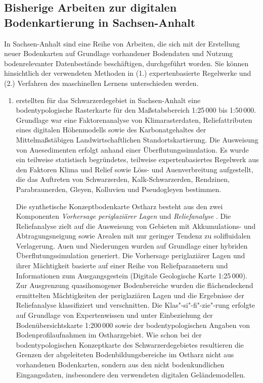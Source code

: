 \subsection{Bisherige Arbeiten zur digitalen Bodenkartierung in Sachsen-Anhalt}\label{sec:dsm}
In Sachsen-Anhalt sind eine Reihe von Arbeiten, die sich mit der Erstellung neuer Bodenkarten auf Grundlage vorhandener Bodendaten und Nutzung bodenrelevanter Datenbestände beschäftigen, durchgeführt worden. Sie können hinsichtlich der verwendeten Methoden in (1.) expertenbasierte Regelwerke und (2.) Verfahren des maschinellen Lernens unterschieden werden.

\begin{enumerate}
\item \citet{BehrensScholten2003a} erstellten für das Schwarzerdegebiet in Sachsen-Anhalt eine bodentypologische Rasterkarte für den Maßstabsbereich 1:25\,000 bis 1:50\,000. Grundlage war eine Faktorenanalyse von Klimarasterdaten, Reliefattributen eines digitalen Höhenmodells sowie des Karbonatgehaltes der Mittelmaßstäbigen Landwirtschaftlichen Standortskartierung. Die Ausweisung von Auesedimenten erfolgt anhand einer Überflutungssimulation. Es wurde ein teilweise statistisch begründetes, teilweise expertenbasiertes Regelwerk aus den Faktoren Klima und Relief sowie Löss- und Auenverbreitung aufgestellt, die das Auftreten von Schwarzerden, Kalk-Schwarzerden, Rendzinen, Parabraunerden, Gleyen, Kolluvien und Pseudogleyen bestimmen.\

Die synthetische Konzeptbodenkarte Ostharz  besteht aus den zwei Komponenten \textit{Vorhersage periglaziärer Lagen} und \textit{Reliefanalyse} \citep{ScholtenBehrensHenningsen2001}. Die Reliefanalyse zielt auf die Ausweisung von Gebieten mit Akkumulations- und Abtragungsneigung sowie Arealen mit nur geringer Tendenz zu solifluidalen Verlagerung. Auen und Niederungen wurden auf Grundlage einer hybriden Überflutungssimulation generiert. Die Vorhersage periglaziärer Lagen und ihrer Mächtigkeit basierte auf einer Reihe von Reliefparametern und Informationen zum Ausgangsgestein (Digitale Geologische Karte 1:25\,000). Zur Ausgrenzung quasihomogener Bodenbereiche wurden die flächendeckend ermittelten Mächtigkeiten der periglaziären Lagen und die Ergebnisse der Reliefanalyse klassifiziert und verschnitten. Die Klas"-si"-fi"-zie"-rung erfolgte auf Grundlage von Expertenwissen und unter Einbeziehung der Bodenübersichtskarte 1:200\,000 sowie der bodentypologischen Angaben von Bodenprofilaufnahmen im Ostharzgebiet. Wie schon bei der bodentypologischen Konzeptkarte des Schwarzerdegebietes resultieren die Grenzen der abgeleiteten Bodenbildungsbereiche im Ostharz nicht aus vorhandenen Bodenkarten, sondern aus den nicht bodenkundlichen Eingangsdaten, insbesondere den verwendeten digitalen Geländemodellen.\


\end{enumerate}
